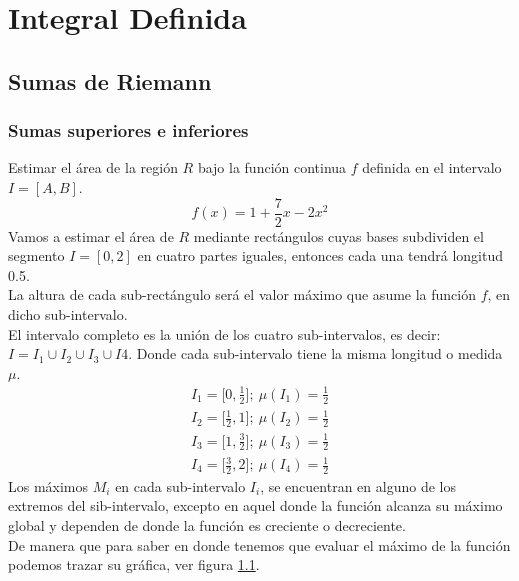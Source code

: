 \part{Integral Definida} %
\label{prt:integral_ _definida_}
	\chapter{Sumas de Riemann} %
	\label{cha:sumas_de_riemann}
		\section{Sumas superiores e inferiores} %
		\label{sec:sumas_superiores_e_inferiores}
			\begin{ejer}[1]
			Estimar el área de la región $R$ bajo la función continua $f$ definida en el intervalo $I=[A,B]$.
			\begin{equation}
				f(x) = 1 + \frac{7}{2} x - 2 x^2
			\end{equation}
			Vamos a estimar el área de $R$ mediante rectángulos cuyas bases subdividen el segmento $ I = [0,2] $ en cuatro partes iguales, entonces cada una tendrá longitud 0.5. \\ 
			La altura de cada sub-rectángulo será el valor máximo que asume la función $f$, en dicho sub-intervalo. \\
			El intervalo completo es la unión de los cuatro sub-intervalos, es decir: $ I = I_1 \cup I_2 \cup I_3 \cup I4 $. Donde cada sub-intervalo tiene la misma longitud o medida $\mu$.
			\begin{eqnarray*}
				I_1 = \Big[0,\frac{1}{2}\Big]; \ \mu(I_1) = \frac{1}{2} \\
				I_2 = \Big[\frac{1}{2}, 1\Big]; \ \mu(I_2) = \frac{1}{2} \\
				I_3 = \Big[1,\frac{3}{2}\Big]; \ \mu(I_3) = \frac{1}{2} \\
				I_4 = \Big[\frac{3}{2}, 2\Big]; \ \mu(I_4) = \frac{1}{2}
			\end{eqnarray*}
			Los máximos $M_i$ en cada sub-intervalo $I_i$, se encuentran en alguno de los extremos del sib-intervalo, excepto en aquel donde la función alcanza su máximo global y dependen de  donde la función es creciente o decreciente. \\
			De manera que para saber en donde tenemos que evaluar el máximo de la función podemos trazar su gráfica, ver figura \ref{graficaf}. \\
			\begin{figure}[h]\label{graficaf}

\end{figure}
\end{ejer}
